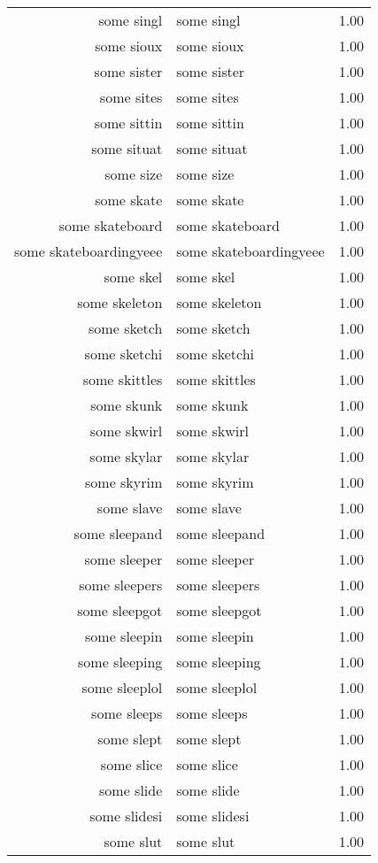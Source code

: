 \begin{table}[ht]
\begin{tabular}{rlr}
  some singl & some singl & 1.00 \\ 
  some sioux & some sioux & 1.00 \\ 
  some sister & some sister & 1.00 \\ 
  some sites & some sites & 1.00 \\ 
  some sittin & some sittin & 1.00 \\ 
  some situat & some situat & 1.00 \\ 
  some size & some size & 1.00 \\ 
  some skate & some skate & 1.00 \\ 
  some skateboard & some skateboard & 1.00 \\ 
  some skateboardingyeee & some skateboardingyeee & 1.00 \\ 
  some skel & some skel & 1.00 \\ 
  some skeleton & some skeleton & 1.00 \\ 
  some sketch & some sketch & 1.00 \\ 
  some sketchi & some sketchi & 1.00 \\ 
  some skittles & some skittles & 1.00 \\ 
  some skunk & some skunk & 1.00 \\ 
  some skwirl & some skwirl & 1.00 \\ 
  some skylar & some skylar & 1.00 \\ 
  some skyrim & some skyrim & 1.00 \\ 
  some slave & some slave & 1.00 \\ 
  some sleepand & some sleepand & 1.00 \\ 
  some sleeper & some sleeper & 1.00 \\ 
  some sleepers & some sleepers & 1.00 \\ 
  some sleepgot & some sleepgot & 1.00 \\ 
  some sleepin & some sleepin & 1.00 \\ 
  some sleeping & some sleeping & 1.00 \\ 
  some sleeplol & some sleeplol & 1.00 \\ 
  some sleeps & some sleeps & 1.00 \\ 
  some slept & some slept & 1.00 \\ 
  some slice & some slice & 1.00 \\ 
  some slide & some slide & 1.00 \\ 
  some slidesi & some slidesi & 1.00 \\ 
  some slut & some slut & 1.00 \\ 

\end{tabular}
\end{table}

